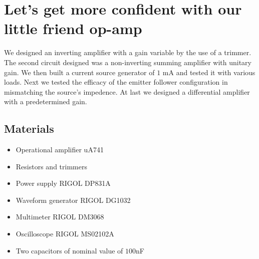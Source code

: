 \chapter{Let's get more confident with our little friend op-amp}
We designed an inverting amplifier with a gain variable by the use of a trimmer. The second circuit designed was a non-inverting summing amplifier with unitary gain. We then built a current source generator of $1$ mA and tested it with various loads. Next we tested the efficacy of the emitter follower configuration in mismatching the source's impedence. At last we designed a differential amplifier with a predetermined gain.

\section{Materials}
\begin{itemize}
\item Operational amplifier uA741
\item Resistors and trimmers
\item Power supply RIGOL DP831A
\item Waveform generator RIGOL DG1032
\item Multimeter RIGOL DM3068
\item Oscilloscope RIGOL MS02102A
\item Two capacitors of nominal value of $100$nF
\end{itemize}

